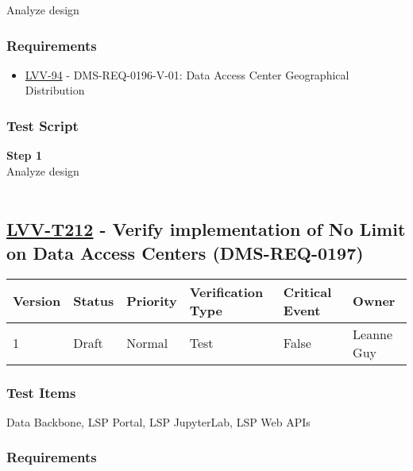 Analyze design

\hypertarget{requirements-188}{%
\subsubsection{Requirements}\label{requirements-188}}

\begin{itemize}
\tightlist
\item
  \href{https://jira.lsstcorp.org/browse/LVV-94}{LVV-94} -
  DMS-REQ-0196-V-01: Data Access Center Geographical Distribution
\end{itemize}

\hypertarget{test-script-188}{%
\subsubsection{Test Script}\label{test-script-188}}

\textbf{Step 1}\\
Analyze design\\
~\\

\hypertarget{lvv-t212---verify-implementation-of-no-limit-on-data-access-centers-dms-req-0197}{%
\subsection{\texorpdfstring{\href{https://jira.lsstcorp.org/secure/Tests.jspa\#/testCase/LVV-T212}{LVV-T212}
- Verify implementation of No Limit on Data Access Centers
(DMS-REQ-0197)}{LVV-T212 - Verify implementation of No Limit on Data Access Centers (DMS-REQ-0197)}}\label{lvv-t212---verify-implementation-of-no-limit-on-data-access-centers-dms-req-0197}}

\begin{longtable}[]{@{}llllll@{}}
\toprule
Version & Status & Priority & Verification Type & Critical Event &
Owner\tabularnewline
\midrule
\endhead
1 & Draft & Normal & Test & False & Leanne Guy\tabularnewline
\bottomrule
\end{longtable}

\hypertarget{test-items-188}{%
\subsubsection{Test Items}\label{test-items-188}}

Data Backbone, LSP Portal, LSP JupyterLab, LSP Web APIs~

\hypertarget{requirements-189}{%
\subsubsection{Requirements}\label{requirements-189}}

